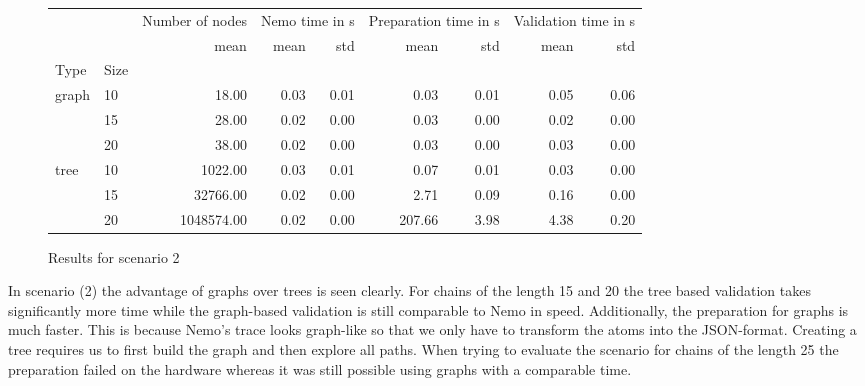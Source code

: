 \begin{figure}
\begin{tabular}{llrrrrrrr}
    &  & Number of nodes & \multicolumn{2}{r}{Nemo time in s} & \multicolumn{2}{r}{Preparation time in s} & \multicolumn{2}{r}{Validation time in s} \\
    &  & mean & mean & std & mean & std & mean & std \\
   Type & Size &  &  &  &  &  &  &  \\
   \multirow[c]{3}{*}{graph} & 10 & 18.00 & 0.03 & 0.01 & 0.03 & 0.01 & 0.05 & 0.06 \\
    & 15 & 28.00 & 0.02 & 0.00 & 0.03 & 0.00 & 0.02 & 0.00 \\
    & 20 & 38.00 & 0.02 & 0.00 & 0.03 & 0.00 & 0.03 & 0.00 \\
   \multirow[c]{3}{*}{tree} & 10 & 1022.00 & 0.03 & 0.01 & 0.07 & 0.01 & 0.03 & 0.00 \\
    & 15 & 32766.00 & 0.02 & 0.00 & 2.71 & 0.09 & 0.16 & 0.00 \\
    & 20 & 1048574.00 & 0.02 & 0.00 & 207.66 & 3.98 & 4.38 & 0.20 \\
\end{tabular}
\caption{Results for scenario 2}
\end{figure}

In scenario (2) the advantage of graphs over trees is seen clearly. For chains of the length 15 and 20 the tree based validation takes significantly more time while the graph-based validation is still comparable to Nemo in speed. Additionally, the preparation for graphs is much faster. This is because Nemo's trace looks graph-like so that we only have to transform the atoms into the JSON-format. Creating a tree requires us to first build the graph and then explore all paths. When trying to evaluate the scenario for chains of the length 25 the preparation failed on the hardware whereas it was still possible using graphs with a comparable time.


